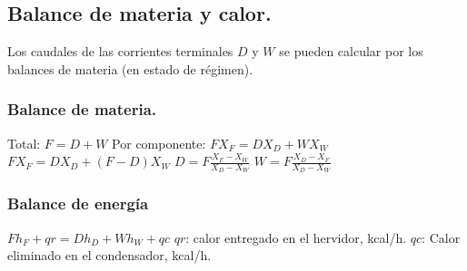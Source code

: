 \documentclass[11pt,openany]{book}
\begin{document}
\subsection{Balance de materia y calor.}
Los caudales de las corrientes terminales $D$ y $W$ se pueden calcular por los balances de materia 
(en estado de régimen).

\subsubsection{Balance de materia.}
Total: $F=D+W$
\newline\newline
Por componente: $F X_F = D X_D + W X_W$
\newline\newline
$F X_F = D X_D + (F-D) X_W$
\newline\newline
$D=F \frac{X_F - X_W}{X_D-X_W}$
\newline\newline
$W=F \frac{X_D - X_F}{X_D-X_W}$
\subsubsection{Balance de energía}
$F h_F +qr = D h_D + W h_W + qc$
\newline\newline
$qr$: calor entregado en el hervidor, kcal/h.
$qc$: Calor eliminado en el condensador, kcal/h.
\end{document}

